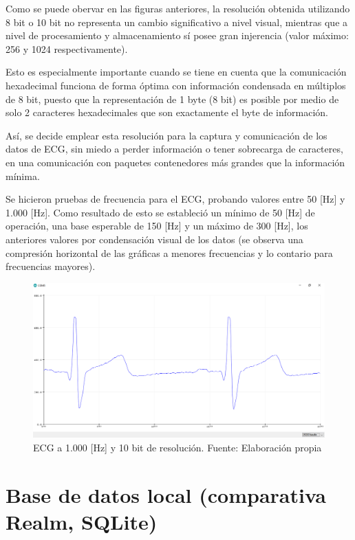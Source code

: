 \newpage

Como se puede obervar en las figuras anteriores, la resolución obtenida utilizando 8 bit o 10 bit no representa un cambio significativo a nivel visual, mientras que a nivel de procesamiento y almacenamiento sí posee gran injerencia (valor máximo: 256 y 1024 respectivamente). 

Esto es especialmente importante cuando se tiene en cuenta que la comunicación hexadecimal funciona de forma óptima con información condensada en múltiplos de 8 bit, puesto que la representación de 1 byte (8 bit) es posible por medio de solo 2 caracteres hexadecimales que son exactamente el byte de información.

Así, se decide emplear esta resolución para la captura y comunicación de los datos de ECG, sin miedo a perder información o tener sobrecarga de caracteres, en una comunicación con paquetes contenedores más grandes que la información mínima.

Se hicieron pruebas de frecuencia para el ECG, probando valores entre 50 [Hz] y 1.000 [Hz]. Como resultado de esto se estableció un mínimo de 50 [Hz] de operación, una base esperable de 150 [Hz] y un máximo de 300 [Hz], los anteriores valores por condensación visual de los datos (se observa una compresión horizontal de las gráficas a menores frecuencias y lo contario para frecuencias mayores).

\begin{figure}[H]
	\centering
	\includegraphics[scale=0.4]{figuras/proto2/1000hz.png}
	\caption{ECG a 1.000 [Hz] y 10 bit de resolución. Fuente: Elaboración propia}
	\label{1000hz}
\end{figure}

\section{Base de datos local (comparativa Realm, SQLite) }

